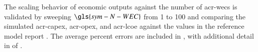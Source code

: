 
    \begin{table}[htbp]
        \centering
        \ifdefined\JOURNALTWOCOLUMN
            
        \else
            
        \fi
        \caption{Verification}
        \label{tab:validation}
    \end{table}


The scaling behavior of economic outputs against the number of \glspl{acr-wec} is validated by sweeping $\gls{sym-N-WEC}$ from 1 to 100 and comparing the simulated \gls{acr-capex}, \gls{acr-opex}, and \gls{acr-lcoe} against the values in the reference model report \citep{RM3}.
The average percent errors are included in , with additional detail in  of .

